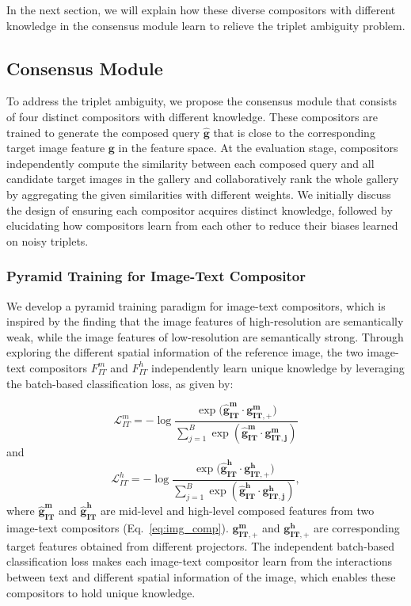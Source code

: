 \documentclass[sigconf]{acmart}
\begin{document}
In the next section, we will explain how these diverse compositors with different knowledge in the consensus module learn to relieve the triplet ambiguity problem.

\subsection{Consensus Module}
\label{subsec:consensus}

To address the triplet ambiguity, we propose the consensus module that consists of four distinct compositors with different knowledge. These compositors are trained to generate the composed query $\bm{\hat{g}}$ that is close to the corresponding target image feature $\bm{g}$ in the feature space. At the evaluation stage, compositors independently compute the similarity between each composed query and all candidate target images in the gallery and collaboratively rank the whole gallery by aggregating the given similarities with different weights. We initially discuss the design of ensuring each compositor acquires distinct knowledge, followed by elucidating how compositors learn from each other to reduce their biases learned on noisy triplets.

\subsubsection{Pyramid Training for Image-Text Compositor}\label{subsubsec:pyramid}

We develop a pyramid training paradigm for image-text compositors, which is inspired by the finding \cite{lin2017feature,miech2021thinking} that the image features of high-resolution are semantically weak, while the image features of low-resolution are semantically strong. Through exploring the different spatial information of the reference image, the two image-text compositors $F^m_{IT}$ and $F^h_{IT}$ independently learn unique knowledge by leveraging the batch-based classification loss, as given by:

\begin{equation}
\label{eq:lossitm}
    \mathcal{L}_{IT}^m = -\log\frac{\exp(\bm{\hat{g}_{IT}^m} \cdot \bm{g_{IT,+}^m)}}{\sum_{j=1}^{B}\exp(\bm{\hat{g}_{IT}^m} \cdot \bm{g_{IT, j}^m} )}
\end{equation}
and
\begin{equation}
\label{eq:lossith}
    \mathcal{L}_{IT}^h = -\log\frac{\exp(\bm{\hat{g}_{IT}^h} \cdot \bm{g_{IT,+}^h)}}{\sum_{j=1}^{B}\exp(\bm{\hat{g}_{IT}^h} \cdot \bm{g_{IT, j}^h} )},
\end{equation}
where $\bm{\hat{g}_{IT}^m}$ and $\bm{\hat{g}_{IT}^h}$ are mid-level and high-level composed features from two image-text compositors (Eq.~\ref{eq:img_comp}). $\bm{g_{IT,+}^m}$ and $\bm{g_{IT,+}^h}$ are corresponding target features obtained from different projectors. The independent batch-based classification loss makes each image-text compositor learn from the interactions between text and different spatial information of the image, which enables these compositors to hold unique knowledge. 
\end{document}
